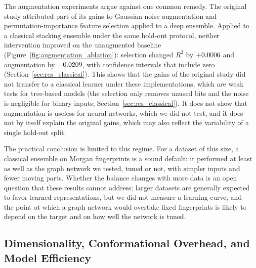 The augmentation experiments argue against one common remedy. The original study attributed part of its gains to Gaussian-noise augmentation and permutation-importance feature selection applied to a deep ensemble. Applied to a classical stacking ensemble under the same hold-out protocol, neither intervention improved on the unaugmented baseline (Figure~\ref{fig:augmentation_ablation}): selection changed $R^2$ by $+0.0006$ and augmentation by $-0.0209$, with confidence intervals that include zero (Section~\ref{sec:res_classical}). This shows that the gains of the original study did not transfer to a classical learner under these implementations, which are weak tests for tree-based models (the selection only removes unused bits and the noise is negligible for binary inputs; Section~\ref{sec:res_classical}). It does not show that augmentation is useless for neural networks, which we did not test, and it does not by itself explain the original gains, which may also reflect the variability of a single hold-out split.

The practical conclusion is limited to this regime. For a dataset of this size, a classical ensemble on Morgan fingerprints is a sound default: it performed at least as well as the graph network we tested, tuned or not, with simpler inputs and fewer moving parts. Whether the balance changes with more data is an open question that these results cannot address; larger datasets are generally expected to favor learned representations, but we did not measure a learning curve, and the point at which a graph network would overtake fixed fingerprints is likely to depend on the target and on how well the network is tuned.


\subsection{Dimensionality, Conformational Overhead, and Model Efficiency}

